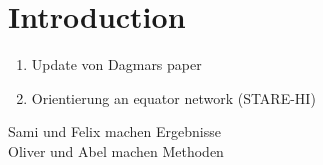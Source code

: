 \section*{Introduction}
\begin{enumerate}
    \item Update von Dagmars paper
    \item Orientierung an equator network (STARE-HI)
\end{enumerate}

Sami und Felix machen Ergebnisse\\
Oliver und Abel machen Methoden